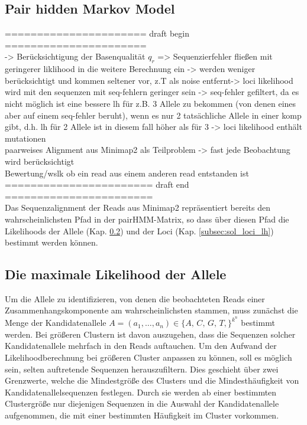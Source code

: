 \subsection{Pair hidden Markov Model} \label{subsec:sol_phmm}

\noindent====================== draft begin ======================\\

-> Berücksichtigung der Basenqualität $q_{r}$ => Sequenzierfehler fließen mit geringerer liklihood in die weitere Berechnung ein -> werden weniger berücksichtigt und kommen seltener vor, z.T als noise entfernt-> loci likelihood wird mit den sequenzen mit seq-fehlern geringer sein -> seq-fehler gefiltert, da es nicht möglich ist eine  bessere lh für z.B. 3 Allele zu bekommen (von denen eines aber auf einem seq-fehler beruht), wenn es nur 2 tatsächliche Allele in einer komp gibt, d.h. lh für 2 Allele ist in diesem fall höher als für 3 -> loci likelihood enthält mutationen \\
paarweises Alignment aus Minimap2 als Teilproblem -> fast jede Beobachtung wird berücksichtigt\\
Bewertung/wslk ob ein read aus einem anderen read entstanden ist\\

\noindent======================= draft end =======================\\

Das Sequenzalignment der Reads aus Minimap2 repräsentiert bereits den wahrscheinlichsten Pfad in der pairHMM-Matrix, so dass über diesen Pfad die Likelihoods der Allele (Kap. \ref{subsec:sol_allele_lh}) und der Loci (Kap. \ref{subsec:sol_loci_lh}) bestimmt werden können.

\subsection{Die maximale Likelihood der Allele} \label{subsec:sol_allele_lh}

Um die Allele zu identifizieren, von denen die beobachteten Reads einer Zusammenhangskomponente am wahrscheinlichsten stammen, muss zunächst die Menge der Kandidatenallele $A=(a_{1}, \dots, a_{n}) \in \{A,\,C,\,G,\,T,\}^{k^n}$ bestimmt werden. Bei größeren Clustern ist davon auszugehen, dass die Sequenzen solcher Kandidatenallele mehrfach in den Reads auftauchen. Um den Aufwand der Likelihoodberechnung bei größeren Cluster anpassen zu können, soll es möglich sein, selten auftretende Sequenzen herauszufiltern. Dies geschieht über zwei Grenzwerte, welche die Mindestgröße des Clusters und die Mindesthäufigkeit von Kandidatenallelsequenzen festlegen. Durch sie werden ab einer bestimmten Clustergröße nur diejenigen Sequenzen in die Auswahl der Kandidatenallele aufgenommen, die mit einer bestimmten Häufigkeit im Cluster vorkommen.\\

